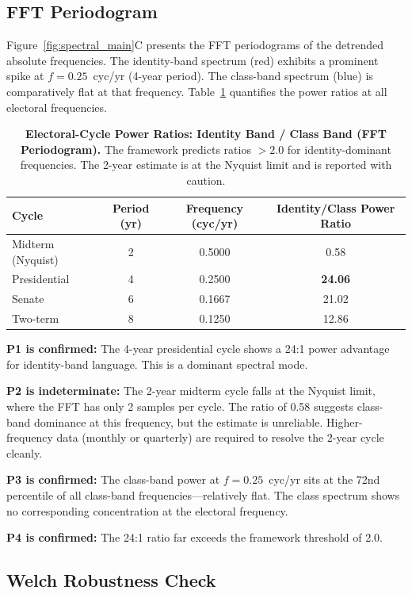 \subsection{FFT Periodogram}

Figure~\ref{fig:spectral_main}C presents the FFT periodograms of the detrended absolute frequencies. The identity-band spectrum (red) exhibits a prominent spike at $f = 0.25$~cyc/yr (4-year period). The class-band spectrum (blue) is comparatively flat at that frequency. Table~\ref{tab:spectral_ratios} quantifies the power ratios at all electoral frequencies.

\begin{table}[htbp]
\centering
\caption{\textbf{Electoral-Cycle Power Ratios: Identity Band / Class Band (FFT Periodogram).} The framework predicts ratios $> 2.0$ for identity-dominant frequencies. The 2-year estimate is at the Nyquist limit and is reported with caution.}
\label{tab:spectral_ratios}
\begin{tabular}{lccc}
\toprule
Cycle & Period (yr) & Frequency (cyc/yr) & Identity/Class Power Ratio \\
\midrule
Midterm (Nyquist) & 2 & 0.5000 & 0.58 \\
Presidential & 4 & 0.2500 & \textbf{24.06} \\
Senate & 6 & 0.1667 & 21.02 \\
Two-term & 8 & 0.1250 & 12.86 \\
\bottomrule
\end{tabular}
\end{table}

\textbf{P1 is confirmed:} The 4-year presidential cycle shows a 24:1 power advantage for identity-band language. This is a dominant spectral mode.

\textbf{P2 is indeterminate:} The 2-year midterm cycle falls at the Nyquist limit, where the FFT has only 2 samples per cycle. The ratio of 0.58 suggests class-band dominance at this frequency, but the estimate is unreliable. Higher-frequency data (monthly or quarterly) are required to resolve the 2-year cycle cleanly.

\textbf{P3 is confirmed:} The class-band power at $f = 0.25$~cyc/yr sits at the 72nd percentile of all class-band frequencies---relatively flat. The class spectrum shows no corresponding concentration at the electoral frequency.

\textbf{P4 is confirmed:} The 24:1 ratio far exceeds the framework threshold of 2.0.

\subsection{Welch Robustness Check}

